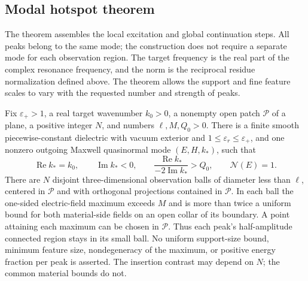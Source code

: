 \subsection{Modal hotspot theorem}

The theorem assembles the local excitation and global continuation steps.
All peaks belong to the same mode; the construction does not require a
separate mode for each observation region. The target
frequency is the real part of the complex resonance frequency, and the
norm is the reciprocal residue normalization defined above.  The theorem
allows the support and fine feature scales to vary with the requested
number and strength of peaks.

\begin{theorem}
\label{ms:modal-packing}
Fix $\varepsilon_+>1$, a real target wavenumber $k_0>0$, a
nonempty open patch $\mathcal P$ of a plane, a positive integer
$N$, and numbers $\ell,M,Q_0>0$.  There is a finite smooth
piecewise-constant dielectric with vacuum exterior and
$1\leq\varepsilon_r\leq\varepsilon_+$, and one nonzero outgoing
Maxwell quasinormal mode $(E,H,k_*)$, such that
\begin{equation}
 \operatorname{Re}k_*=k_0,\qquad
 \operatorname{Im}k_*<0,\qquad
 \frac{\operatorname{Re}k_*}{-2\operatorname{Im}k_*}>Q_0,
 \qquad \mathcal N(E)=1.
 \label{ms:modal-parameters}
\end{equation}
There are $N$ disjoint three-dimensional observation balls of
diameter less than $\ell$, centered in $\mathcal P$ and with
orthogonal projections contained in $\mathcal P$.  In each ball
the one-sided electric-field maximum exceeds $M$ and is more than
twice a uniform bound for both material-side fields on an open
collar of its boundary.  A point
attaining each maximum can be chosen in $\mathcal P$.
Thus each peak's half-amplitude connected region stays in its
small ball.  No uniform support-size bound, minimum feature size,
nondegeneracy of the maximum, or positive energy fraction per peak
is asserted.  The insertion contrast may depend on $N$; the common
material bounds do not.
\end{theorem}

